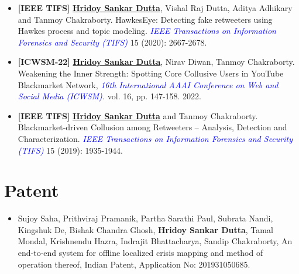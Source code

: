 \documentclass[margin, centered]{res}
\begin{document}
\begin{resume}
\begin{itemize}[leftmargin=*]
\item  \textbf{[IEEE TIFS]} \textbf{\underline{Hridoy Sankar Dutta}},  Vishal Raj Dutta,  Aditya Adhikary and Tanmoy Chakraborty. HawkesEye: Detecting fake retweeters using Hawkes process and topic modeling. \textit{\textcolor{blue}{IEEE Transactions on Information Forensics and Security (TIFS)}} 15 (2020): 2667-2678.
\item  \textbf{[ICWSM-22]} \textbf{\underline{Hridoy Sankar Dutta}}, Nirav Diwan, Tanmoy Chakraborty. Weakening the Inner Strength: Spotting Core Collusive Users in YouTube Blackmarket Network,  \textit{\textcolor{blue}{16th International AAAI Conference on Web and Social Media (ICWSM)}.}  vol. 16, pp. 147-158. 2022.
\item  \textbf{[IEEE TIFS]} \textbf{\underline{Hridoy Sankar Dutta}} and Tanmoy Chakraborty. Blackmarket-driven Collusion among Retweeters – Analysis, Detection and Characterization. \textit{\textcolor{blue}{IEEE Transactions on Information Forensics and Security (TIFS)}} 15 (2019): 1935-1944.


\end{itemize}

\section{Patent}
\begin{itemize}[leftmargin=*]

\item Sujoy Saha,  Prithviraj Pramanik,  Partha Sarathi Paul,  Subrata Nandi,  Kingshuk De,  Bishak Chandra Ghosh,  \textbf{Hridoy Sankar Dutta},  Tamal Mondal,  Krishnendu Hazra,  Indrajit Bhattacharya,  Sandip Chakraborty,  An end‐to‐end system for offline localized crisis mapping and method of operation thereof, Indian Patent,  Application No: 201931050685.

\end{itemize}


\end{resume}
\end{document}
